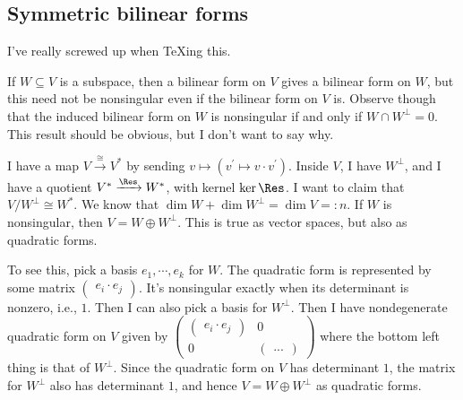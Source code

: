 \subsection{Symmetric bilinear forms}
I've really screwed up when TeXing this.

If $W\subseteq V$ is a subspace, then a bilinear form on $V$ gives a bilinear form on $W$, but this need not be nonsingular even if the bilinear form on $V$ is. Observe though that the induced bilinear form on $W$ is nonsingular if and only if $W\cap W^\perp=0$. This result should be obvious, but I don't want to say why.

I have a map $V\xrightarrow{\cong} V^\ast$ by sending $v\mapsto(v^\prime\mapsto v\cdot v^\prime)$. Inside $V$, I have $W^\perp$, and I have a quotient $V^\ast\xrightarrow{\Res} W^\ast$, with kernel $\ker\Res$. I want to claim that $V/W^\perp\cong W^\ast$. We know that $\dim W+\dim W^\perp=\dim V=:n$. If $W$ is nonsingular, then $V=W\oplus W^\perp$. This is true as vector spaces, but also as quadratic forms.

To see this, pick a basis $e_1,\cdots,e_k$ for $W$. The quadratic form is represented by some matrix $\begin{pmatrix} e_i\cdot e_j \end{pmatrix}$. It's nonsingular exactly when its determinant is nonzero, i.e., $1$. Then I can also pick a basis for $W^\perp$. Then I have nondegenerate quadratic form on $V$ given by $\begin{pmatrix}\begin{pmatrix} e_i\cdot e_j \end{pmatrix} & 0 \\ 0 & \begin{pmatrix} ... \end{pmatrix}\end{pmatrix}$ where the bottom left thing is that of $W^\perp$. Since the quadratic form on $V$ has determinant $1$, the matrix for $W^\perp$ also has determinant $1$, and hence $V=W\oplus W^\perp$ as quadratic forms.


